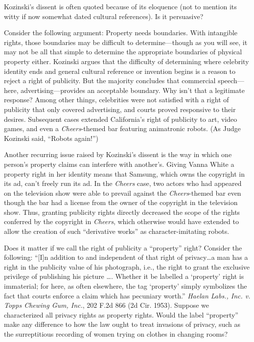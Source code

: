 \item Kozinski's dissent is often quoted because of its eloquence (not to
mention its witty if now somewhat dated cultural references).  Is it persuasive?

Consider the following argument: Property needs boundaries.  With intangible
rights, those boundaries may be difficult to determine---though as you will
see, it may not be all that simple to determine the appropriate boundaries of
physical property either.  Kozinski argues that the difficulty of determining
where celebrity identity ends and general cultural reference or invention
begins is a reason to reject a right of publicity.  But the majority concludes
that commercial speech---here, advertising---provides an acceptable boundary.
 Why isn't that a legitimate response?  Among other things, celebrities were
not satisfied with a right of publicity that only covered advertising, and
courts proved responsive to their desires.  Subsequent cases extended
California's right of publicity to art, video games, and even a
\textit{Cheers}-themed bar featuring animatronic robots.  (As Judge Kozinski
said, ``Robots again!'')  

\item Another recurring issue raised by Kozinski's dissent is the way in which
one person's property claims can interfere with another's.  Giving Vanna White a
property right in her identity means that Samsung, which owns the copyright in
its ad, can't freely run its ad.  In the \textit{Cheers} case, two actors who
had appeared on the television show were able to prevail against the
\textit{Cheers}-themed bar even though the bar had a license from the owner of
the copyright in the television show.  Thus, granting publicity rights directly
decreased the scope of the rights conferred by the copyright in \textit{Cheers},
which otherwise would have extended to allow the creation of such ``derivative
works'' as character-imitating robots.

\item Does it matter if we call the right of publicity a ``property'' right?
Consider the following: ``[I]n addition to and independent of that right of
privacy\ldots a man has a right in the publicity value of his photograph, i.e.,
the right to grant the exclusive privilege of publishing his picture \ldots.
Whether it be labelled a `property' right is immaterial; for here, as often
elsewhere, the tag `property' simply symbolizes the fact that courts enforce a
claim which has pecuniary worth.'' \emph{Haelan Labs., Inc. v. Topps Chewing
Gum, Inc.}, 202 F.2d 866 (2d Cir. 1953).  Suppose we characterized all privacy
rights
as property rights.  Would the label ``property'' make any difference to how the
law ought to treat invasions of privacy, such as the surreptitious recording of
women trying on clothes in changing rooms?
